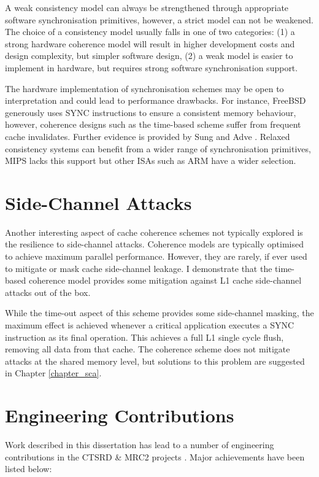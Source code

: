 			A weak consistency model can always be strengthened through appropriate software synchronisation primitives, however, a strict model can not be weakened. The choice of a consistency model usually falls in one of two categories: (1) a strong hardware coherence model will result in higher development costs and design complexity, but simpler software design, (2)  a weak model is easier to implement in hardware, but requires strong software synchronisation support.
			
			The hardware implementation of synchronisation schemes may be open to interpretation and could lead to performance drawbacks. For instance, FreeBSD generously uses SYNC instructions to ensure a consistent memory behaviour, however, coherence designs such as the time-based scheme suffer from frequent cache invalidates. Further evidence is provided by Sung and Adve \cite{Sung15}. Relaxed consistency systems can benefit from a wider range of synchronisation primitives, MIPS lacks this support but other ISAs such as ARM have a wider selection.

	\section{Side-Channel Attacks}
		Another interesting aspect of cache coherence schemes not typically explored is the resilience to side-channel attacks. Coherence models are typically optimised to achieve maximum parallel performance. However, they are rarely, if ever used to mitigate or mask cache side-channel leakage. I demonstrate that the time-based coherence model provides some mitigation against L1 cache side-channel attacks out of the box.
		
		While the time-out aspect of this scheme provides some side-channel masking, the maximum effect is achieved whenever a critical application executes a SYNC instruction as its final operation. This achieves a full L1 single cycle flush, removing all data from that cache. The coherence scheme does not mitigate attacks at the shared memory level, but solutions to this problem are suggested in Chapter \ref{chapter_sca}.
	
	
	\section{Engineering Contributions}
		Work described in this dissertation has lead to a number of engineering contributions in the CTSRD \& MRC2 projects \cite{CTSRD,MRC2}. Major achievements have been listed below:
	
